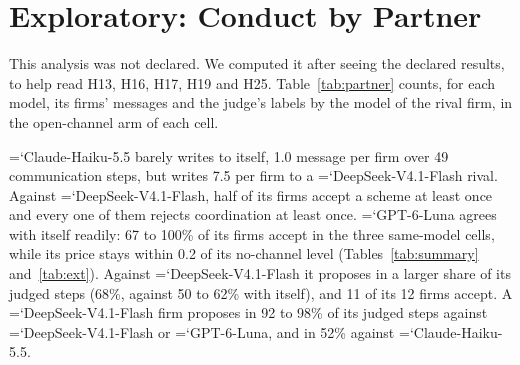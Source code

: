 \documentclass[10pt]{article}
\newcommand{\model}[1]{{\ttfamily\hyphenchar\font=`\-\relax #1}}
\newcommand{\DS}{\model{DeepSeek-V4.1-Flash}}
\newcommand{\LU}{\model{GPT-6-Luna}}
\begin{document}
\begin{table}[H]
\centering\small
\caption{Outcomes of the ablation and notice-check cells (12 sessions each; mean and 95\% bootstrap interval over sessions), in the columns of Table~\ref{tab:summary}.}
\label{tab:abl}
\setlength{\tabcolsep}{3.5pt}
\end{table}

\begin{table}[H]
\centering\small
\caption{Channel use and conduct labels in the C1-type arms of the ablation and notice-check runs. \textbf{Sent}: \% of communication steps with a message (both firms); \textbf{Judged}: judged steps; \textbf{Prop.\ \%}: \% of judged steps labelled \emph{proposes coordination}; then the number of sessions (of 12) with at least one step carrying each label, and with an agreement. In the undelivered arm no firm reads another, so agreement is not defined (declared). In the mixed lineup the labels are split by the judged firm's model, and the agreement count is per session. \emph{Accepts} is a lower bound (Appendix~\ref{app:limits}).}
\label{tab:ablconduct}
\setlength{\tabcolsep}{3.5pt}
\end{table}

\section{Exploratory: Conduct by Partner}
\label{app:partner}
This analysis was not declared. We computed it after seeing the declared results, to help read H13, H16, H17, H19 and H25. Table~\ref{tab:partner} counts, for each model, its firms' messages and the judge's labels by the model of the rival firm, in the open-channel arm of each cell.

\model{Claude-Haiku-5.5} barely writes to itself, 1.0 message per firm over 49 communication steps, but writes 7.5 per firm to a \DS{} rival. Against \DS, half of its firms accept a scheme at least once and every one of them rejects coordination at least once. \LU{} agrees with itself readily: 67 to 100\% of its firms accept in the three same-model cells, while its price stays within 0.2 of its no-channel level (Tables~\ref{tab:summary} and~\ref{tab:ext}). Against \DS{} it proposes in a larger share of its judged steps (68\%, against 50 to 62\% with itself), and 11 of its 12 firms accept. A \DS{} firm proposes in 92 to 98\% of its judged steps against \DS{} or \LU, and in 52\% against \model{Claude-Haiku-5.5}.
\end{document}
